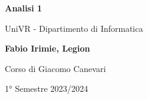 \begin{titlepage}
	\begin{center}
		\vspace*{1cm}

		\Huge
		\textbf{Analisi 1}

		\vspace{0.5cm}
		\LARGE
		UniVR - Dipartimento di Informatica

		\vspace{1.5cm}

		\textbf{Fabio Irimie, Legion}

		\vfill


		\vspace{0.8cm}

    Corso di Giacomo Canevari

		1° Semestre 2023/2024

	\end{center}
\end{titlepage}
